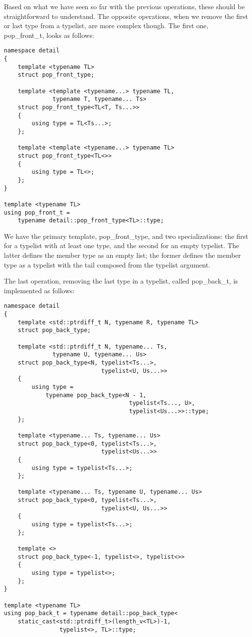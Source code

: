 Based on what we have seen so far with the previous operations, these should be straightforward to understand. The opposite operations, when we remove the first or last type from a typelist, are more complex though. The first one, pop\_front\_t, looks as follows:

\begin{lstlisting}[style=styleCXX]
namespace detail
{
	template <typename TL>
	struct pop_front_type;
	
	template <template <typename...> typename TL,
	          typename T, typename... Ts>
	struct pop_front_type<TL<T, Ts...>>
	{
		using type = TL<Ts...>;
	};

	template <template <typename...> typename TL>
	struct pop_front_type<TL<>>
	{
		using type = TL<>;
	};
}

template <typename TL>
using pop_front_t =
	typename detail::pop_front_type<TL>::type;
\end{lstlisting}

We have the primary template, pop\_front\_type, and two specializations: the first for a typelist with at least one type, and the second for an empty typelist. The latter defines the member type as an empty list; the former defines the member type as a typelist with the tail composed from the typelist argument.

The last operation, removing the last type in a typelist, called pop\_back\_t, is implemented as follows:

\begin{lstlisting}[style=styleCXX]
namespace detail
{
	template <std::ptrdiff_t N, typename R, typename TL>
	struct pop_back_type;
	
	template <std::ptrdiff_t N, typename... Ts,
			  typename U, typename... Us>
	struct pop_back_type<N, typelist<Ts...>,
							typelist<U, Us...>>
	{
		using type =
			typename pop_back_type<N - 1,
									typelist<Ts..., U>,
									typelist<Us...>>::type;
	};

	template <typename... Ts, typename... Us>
	struct pop_back_type<0, typelist<Ts...>,
							typelist<Us...>>
	{
		using type = typelist<Ts...>;
	};

	template <typename... Ts, typename U, typename... Us>
	struct pop_back_type<0, typelist<Ts...>,
							typelist<U, Us...>>
	{
		using type = typelist<Ts...>;
	};

	template <>
	struct pop_back_type<-1, typelist<>, typelist<>>
	{
		using type = typelist<>;
	};
}

template <typename TL>
using pop_back_t = typename detail::pop_back_type<
	static_cast<std::ptrdiff_t>(length_v<TL>)-1,
				typelist<>, TL>::type;
\end{lstlisting}

